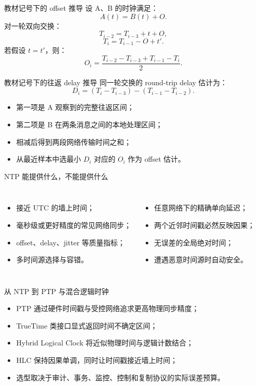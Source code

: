 \documentclass[UTF8,fontset=none,aspectratio=169,10pt]{beamer}
\begin{document}
\begin{frame}{教材记号下的 offset 推导}
设 A、B 的时钟满足：
\[
A(t)=B(t)+O.
\]
对一轮双向交换：
\[
T_{i-2}=T_{i-3}+t+O,
\]
\[
T_i=T_{i-1}-O+t'.
\]
若假设 $t=t'$，则：
\[
O_i=\frac{T_{i-2}-T_{i-3}+T_{i-1}-T_i}{2}.
\]
\end{frame}

\begin{frame}{教材记号下的往返 delay 推导}
同一轮交换的 round-trip delay 估计为：
\[
D_i=(T_i-T_{i-3})-(T_{i-1}-T_{i-2}).
\]
\begin{itemize}
  \item 第一项是 A 观察到的完整往返区间；
  \item 第二项是 B 在两条消息之间的本地处理区间；
  \item 相减后得到两段网络传输时间之和；
  \item 从最近样本中选最小 $D_i$ 对应的 $O_i$ 作为 offset 估计。
\end{itemize}
\end{frame}

\begin{frame}{NTP 能提供什么，不能提供什么}
\begin{columns}[T,onlytextwidth]
\begin{itemize}
  \item 接近 UTC 的墙上时间；
  \item 毫秒级或更好精度的常见网络同步；
  \item offset、delay、jitter 等质量指标；
  \item 多时间源选择与容错。
\end{itemize}
\begin{itemize}
  \item 任意网络下的精确单向延迟；
  \item 两个近邻时间戳必然反映因果；
  \item 无误差的全局绝对时间；
  \item 遭遇恶意时间源时自动安全。
\end{itemize}
\end{columns}
\end{frame}

\begin{frame}{从 NTP 到 PTP 与混合逻辑时钟}
\begin{itemize}
  \item PTP 通过硬件时间戳与受控网络追求更高物理同步精度；
  \item TrueTime 类接口显式返回时间不确定区间；
  \item Hybrid Logical Clock 将近似物理时间与逻辑计数结合；
  \item HLC 保持因果单调，同时让时间戳接近墙上时间；
  \item 选型取决于审计、事务、监控、控制和复制协议的实际误差预算。
\end{itemize}
\vfill
{}
\end{frame}
\end{document}

